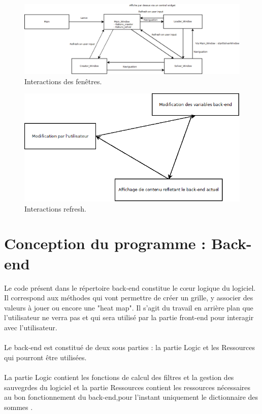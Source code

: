 \documentclass[french,12pt]{article}
\begin{document}
\begin{figure}[ht]
  \begin{center}
    \includegraphics[width=\textwidth]{./ressources/diagramme2.png} 
  \end{center}
  \caption{Interactions des fenêtres.}
\end{figure}

\begin{figure}[ht]
  \begin{center}
    \includegraphics[scale=0.5]{./ressources/diagramme1.png} 
  \end{center}
  \caption{Interactions refresh.}
\end{figure}

\newpage
\section{Conception du programme : Back-end}
Le code présent dans le répertoire back-end constitue le cœur logique du logiciel. Il correspond aux méthodes qui vont permettre de créer un grille, y associer des valeurs à jouer ou  encore une "heat map". Il s'agit du travail en arrière plan que l'utilisateur ne verra pas et qui sera utilisé par la partie front-end pour interagir avec l'utilisateur.
\\ \\ 
Le back-end est constitué de deux sous parties : la partie Logic et les Ressources qui pourront être utilisées. \\ \\
La partie Logic contient les fonctions de calcul des filtres et la gestion des sauvegrdes du logiciel et la partie Ressources contient les ressources nécessaires au bon fonctionnement du back-end,pour l'instant uniquement le  dictionnaire des sommes .
\end{document}
